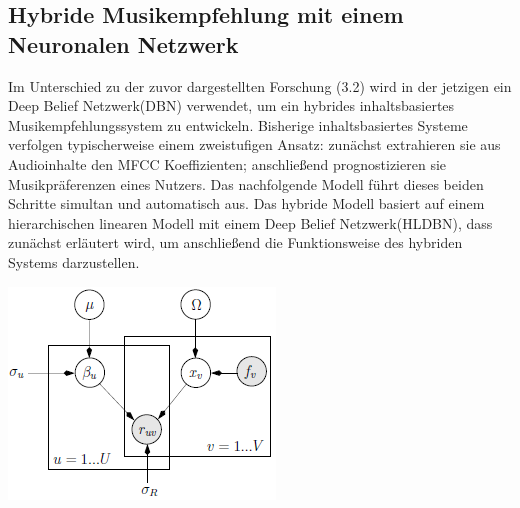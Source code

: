 \documentclass[twosided,a4,10pt]{article}
\begin{document}
\begin{multicols}{2}
		\subsection{Hybride Musikempfehlung mit einem Neuronalen Netzwerk}
		Im Unterschied zu der zuvor dargestellten Forschung (3.2) wird in der jetzigen ein Deep Belief Netzwerk(DBN) verwendet, um ein hybrides inhaltsbasiertes Musikempfehlungssystem zu entwickeln. Bisherige inhaltsbasiertes Systeme verfolgen typischerweise einem zweistufigen Ansatz: zunächst extrahieren sie aus Audioinhalte den MFCC Koeffizienten; anschließend prognostizieren sie Musikpräferenzen eines Nutzers. Das nachfolgende Modell führt dieses beiden Schritte simultan und automatisch aus. \cite{wang}\newline
		Das hybride Modell basiert auf einem hierarchischen linearen Modell mit einem Deep Belief Netzwerk(HLDBN), dass zunächst erläutert wird, um anschließend die Funktionsweise des hybriden Systems darzustellen.
		\begin{minipage}{0.45\textwidth}
			\centering
			\includegraphics{img/hlmdbn.png}
			\label{img:hlmdbn}
		\end{minipage}

\end{multicols}
\end{document}
